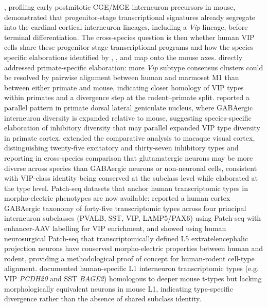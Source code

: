 \documentclass[11pt]{article}
\begin{document}
\citet{Mayer2018}, profiling early postmitotic CGE/MGE interneuron precursors in mouse, demonstrated that progenitor-stage transcriptional signatures already segregate into the cardinal cortical interneuron lineages, including a \textit{Vip} lineage, before terminal differentiation. The cross-species question is then whether human VIP cells share these progenitor-stage transcriptional programs and how the species-specific elaborations identified by \citet{Hodge2019}, \citet{Boldog2018}, and \citet{Lake2018} map onto the mouse axes. \citet{Bakken2021a} directly addressed primate-specific elaboration: more \textit{Vip} subtype consensus clusters could be resolved by pairwise alignment between human and marmoset M1 than between either primate and mouse, indicating closer homology of VIP types within primates and a divergence step at the rodent--primate split. \citet{Bakken2021b} reported a parallel pattern in primate dorsal lateral geniculate nucleus, where GABAergic interneuron diversity is expanded relative to mouse, suggesting species-specific elaboration of inhibitory diversity that may parallel expanded VIP type diversity in primate cortex. \citet{Wei2022} extended the comparative analysis to macaque visual cortex, distinguishing twenty-five excitatory and thirty-seven inhibitory types and reporting in cross-species comparison that glutamatergic neurons may be more diverse across species than GABAergic neurons or non-neuronal cells, consistent with VIP-class identity being conserved at the subclass level while elaborated at the type level. Patch-seq datasets that anchor human transcriptomic types in morpho-electric phenotypes are now available: \citet{Lee2023a} reported a human cortex GABAergic taxonomy of forty-five transcriptomic types across four principal interneuron subclasses (PVALB, SST, VIP, LAMP5/PAX6) using Patch-seq with enhancer-AAV labelling for VIP enrichment, and \citet{Kalmbach2021} showed using human neurosurgical Patch-seq that transcriptomically defined L5 extratelencephalic projection neurons have conserved morpho-electric properties between human and rodent, providing a methodological proof of concept for human-rodent cell-type alignment. \citet{Chartrand2023} documented human-specific L1 interneuron transcriptomic types (e.g. VIP \textit{PCDH20} and SST \textit{BAGE2}) homologous to deeper mouse t-types but lacking morphologically equivalent neurons in mouse L1, indicating type-specific divergence rather than the absence of shared subclass identity.
\end{document}
